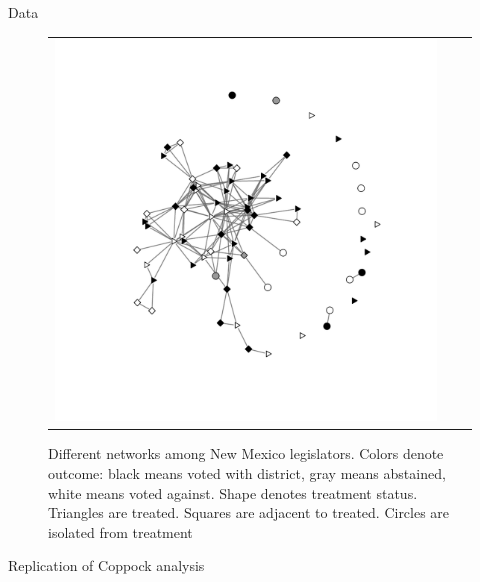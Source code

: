 \documentclass[final]{beamer}
\newlength{\onecolwid}
\newlength{\onecolwidd}
\begin{document}
\begin{frame}[t]
\begin{columns}[t]
\begin{column}{\onecolwidd}
\begin{block}{Data}
\begin{rmfamily}
\begin{figure}
\begin{tabular}{ccc}
	\includegraphics[scale=0.8, clip=true,trim =2cm 2cm 2cm 2cm]{nm_committee_net.pdf} \\ 
	\end{tabular}
	\vspace*{10mm}
	\caption{Different networks among New Mexico legislators. Colors denote outcome: black means voted with district, gray means abstained, white means voted against. Shape denotes treatment status. Triangles are treated. Squares are adjacent to treated. Circles are isolated from treatment}
	\label{fig:nh-nets}
	\end{figure}

	\end{rmfamily}						
	\end{block}
	
	\begin{block}{Replication of Coppock analysis}
	\begin{rmfamily}
	

\end{rmfamily}
\end{block}
\end{column}
\end{columns}
\end{frame}
\end{document}
